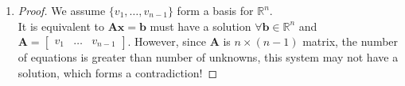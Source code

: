 \begin{enumerate}
\begin{proof}
\begin{enumerate}
\end{enumerate}
\end{proof}
\item
\begin{proof}
We assume $\{v_1,\dots,v_{n-1}\}$ form a basis for $\mathbb{R}^{n}$. \\
It is equivalent to $\bm{Ax} = \bm b$ must have a solution $\forall \bm b\in\mathbb{R}^{n}$ and $\bm A = \left[\begin{array}{c|c|c}
v_1&\dots&v_{n-1}
\end{array}\right]$.
However, since $\bm A$ is $n\times (n-1)$ matrix, the number of equations is greater than number of unknowns, this system may not have a solution, which forms a contradiction!
\end{proof}
\end{enumerate}